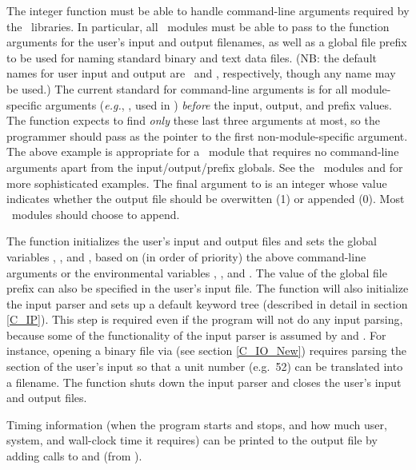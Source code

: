 The integer function  must be able to handle
command-line arguments required by the \PSIthree\ libraries.  In
particular, all \PSIthree\ modules must be able to pass to the
function  arguments for the user's input and
output filenames, as well as a global file prefix to be used for
naming standard binary and text data files.  (NB: the default names
for user input and output are \ and \outputdat, respectively,
though any name may be used.) The current standard for command-line
arguments is for all module-specific arguments ({\em e.g.},
, used in ) {\em before} the input,
output, and prefix values.  The  function expects
to find {\em only} these last three arguments at most, so the
programmer should pass as  the pointer to the first
non-module-specific argument.  The above example is appropriate for a
\PSIthree\ module that requires no command-line arguments apart from
the input/output/prefix globals.  See the \PSIthree\ modules
 and  for more sophisticated examples.
The final argument to  is an integer whose value
indicates whether the output file should be overwitten (1) or appended
(0).  Most \PSIthree\ modules should choose to append.

The  function initializes the user's input and
output files and sets the global variables ,
, and , based on (in order of
priority) the above command-line arguments or the environmental
variables , , and
.  The value of the global file prefix can also be
specified in the user's input file.  The  function
will also initialize the input parser and sets up a default keyword
tree (described in detail in section \ref{C_IP}).  This step is
required even if the program will not do any input parsing, because
some of the functionality of the input parser is assumed by
 and .  For instance, opening a
binary file via  (see section \ref{C_IO_New})
requires parsing the  section of the user's input so
that a unit number (e.g.~52) can be translated into a filename.
The  function shuts down the input parser and closes
the user's input and output files.

Timing information (when the program starts and stops, and how much
user, system, and wall-clock time it requires) can be printed to the
output file by adding calls to  and 
(from ).

